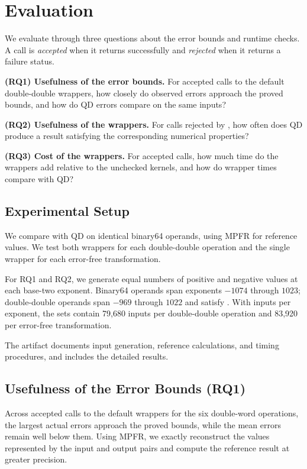 \section{Evaluation}
\label{sec:evaluation}

We evaluate \FenceDD{} through three questions about the error
bounds and runtime checks. A call is \emph{accepted} when it
returns successfully and \emph{rejected} when it returns a
failure status.

\textbf{(RQ1) Usefulness of the error bounds.}
For accepted calls to the default double-double wrappers, how
closely do observed errors approach the proved bounds, and how
do QD errors compare on the same inputs?

\textbf{(RQ2) Usefulness of the wrappers.}
For calls rejected by \FenceDD{}, how often does QD produce a
result satisfying the corresponding numerical properties?

\textbf{(RQ3) Cost of the wrappers.}
For accepted calls, how much
time do the wrappers add relative to the unchecked kernels,
and how do wrapper times compare with QD?

\subsection{Experimental Setup}
\label{sec:evaluation-setup}

We compare \FenceDD{} with QD \citep{Hida2001,QD} on identical
binary64 operands, using MPFR \citep{Fousse2007} for reference
values. We test both wrappers for each double-double operation
and the single wrapper for each error-free transformation.

For RQ1 and RQ2, we generate equal numbers of positive and
negative values at each base-two exponent. Binary64 operands
span exponents $-1074$ through $1023$; double-double operands
span $-969$ through $1022$ and satisfy .
With \RQOneSamplesPerExponent{} inputs per exponent, the sets
contain 79,680 inputs per double-double operation and 83,920
per error-free transformation.

The artifact documents input generation, reference calculations,
and timing procedures, and includes the detailed results.

\subsection{Usefulness of the Error Bounds (RQ1)}

Across accepted calls to the default wrappers for the six double-word
operations, the largest actual errors approach the proved bounds, while the
mean errors remain well below them. Using MPFR, we exactly
reconstruct the values represented by the input and output pairs and compute
the reference result at greater precision.

